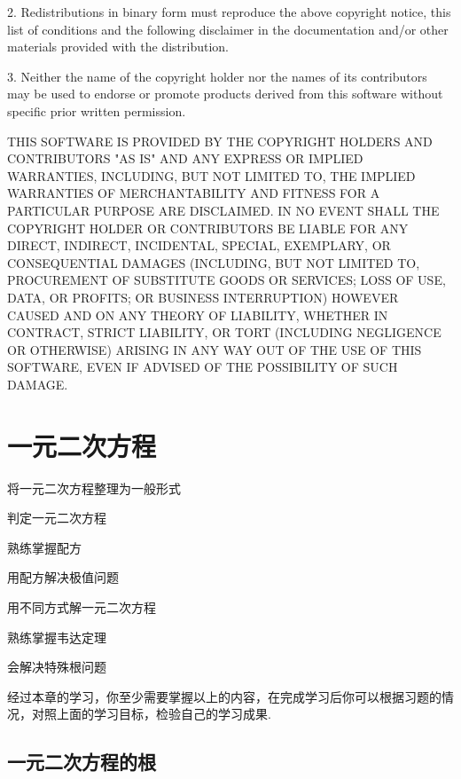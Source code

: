 \documentclass[lang=cn, 10pt, titlestyle=display, oneside, toc=twocol]{elegantbook}
\begin{document}
2. Redistributions in binary form must reproduce the above copyright notice,
   this list of conditions and the following disclaimer in the documentation
   and/or other materials provided with the distribution.

3. Neither the name of the copyright holder nor the names of its
   contributors may be used to endorse or promote products derived from
   this software without specific prior written permission.

THIS SOFTWARE IS PROVIDED BY THE COPYRIGHT HOLDERS AND CONTRIBUTORS "AS IS"
AND ANY EXPRESS OR IMPLIED WARRANTIES, INCLUDING, BUT NOT LIMITED TO, THE
IMPLIED WARRANTIES OF MERCHANTABILITY AND FITNESS FOR A PARTICULAR PURPOSE ARE
DISCLAIMED. IN NO EVENT SHALL THE COPYRIGHT HOLDER OR CONTRIBUTORS BE LIABLE
FOR ANY DIRECT, INDIRECT, INCIDENTAL, SPECIAL, EXEMPLARY, OR CONSEQUENTIAL
DAMAGES (INCLUDING, BUT NOT LIMITED TO, PROCUREMENT OF SUBSTITUTE GOODS OR
SERVICES; LOSS OF USE, DATA, OR PROFITS; OR BUSINESS INTERRUPTION) HOWEVER
CAUSED AND ON ANY THEORY OF LIABILITY, WHETHER IN CONTRACT, STRICT LIABILITY,
OR TORT (INCLUDING NEGLIGENCE OR OTHERWISE) ARISING IN ANY WAY OUT OF THE USE
OF THIS SOFTWARE, EVEN IF ADVISED OF THE POSSIBILITY OF SUCH DAMAGE.

\tableofcontents



\chapter{一元二次方程}



\begin{introduction}

\item 将一元二次方程整理为一般形式
\item 判定一元二次方程
\item 熟练掌握配方
\item 用配方解决极值问题
\item 用不同方式解一元二次方程
\item 熟练掌握韦达定理
\item 会解决特殊根问题

\end{introduction}

经过本章的学习，你至少需要掌握以上的内容，在完成学习后你可以根据习题的情况，对照上面的学习目标，检验自己的学习成果.



\section{一元二次方程的根}
\end{document}
